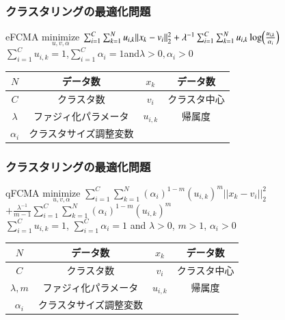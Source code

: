 \documentclass[13pt,dvipdfmx]{beamer}
\begin{document}
\begin{frame}\frametitle{クラスタリングの最適化問題}
  \begin{block}{eFCMA}
    \quad$\underset{u,v,\alpha}{\text{minimize}}$
    $\sum_{i=1}^C\sum_{k=1}^Nu_{i,k}||x_k-v_i||_2^2+\lambda^{-1}\sum_{i=1}^C\sum_{k=1}^Nu_{i,k}\log\Bigl(\frac{u_{i,k}}{\alpha_{i}}\Bigl)$\\
    \qquad\qquad\qquad{}$\sum_{i=1}^Cu_{i,k}=1$\;,\;$\sum_{i=1}^C\alpha_{i}=1$\;and\;$\lambda>0,$\quad$\alpha_{i}>0$
  \end{block}
  \begin{center}
    \begin{tabular}{c|c||c|c} \hline
	  {$N$}&データ数&{$x_k$}&データ数 \\ \hline
	  {$C$}&クラスタ数&{$v_i$}&クラスタ中心\\ \hline
	  {$\lambda$}&ファジィ化パラメータ&{$u_{i,k}$}&帰属度 \\ \hline
	  {$\alpha_i$}&クラスタサイズ調整変数\\ \hline
    \end{tabular}
  \end{center}
\end{frame}

\begin{frame}\frametitle{クラスタリングの最適化問題}
  \begin{block}{qFCMA}
    \quad$\underset{u,v,\alpha}{\text{minimize}}$
    $\sum_{i=1}^C\sum_{k=1}^N(\alpha_{i})^{1-m}(u_{i,k})^m||x_k-v_i||_2^2$
    $+\frac{\lambda^{-1}}{m-1}\sum_{i=1}^C\sum_{k=1}^N(\alpha_{i})^{1-m}(u_{i,k})^m$\\
    \qquad{}$\sum_{i=1}^Cu_{i,k}=1$\;, \;$\sum_{i=1}^C\alpha_{i}=1$\; and \;$\lambda>0$\;, \;$m>1$\;, \;$\alpha_{i}>0$
  \end{block}
  \begin{center}
    \begin{tabular}{c|c||c|c} \hline
	  {$N$}&データ数&{$x_k$}&データ数 \\ \hline
	  {$C$}&クラスタ数&{$v_i$}&クラスタ中心\\ \hline
	  {$\lambda,m$}&ファジィ化パラメータ&{$u_{i,k}$}&帰属度 \\ \hline
	  {$\alpha_i$}&クラスタサイズ調整変数\\ \hline
    \end{tabular}
  \end{center}
\end{frame}
\end{document}
